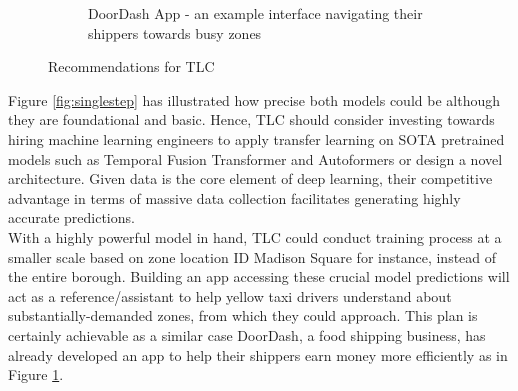 \documentclass[11pt]{article}
\begin{document}
\begin{figure}[ht]
\begin{subfigure}[b]{0.3\textwidth}
        \caption{DoorDash App - an example interface navigating their shippers towards busy zones}
        \label{subfig:plot2}
    \end{subfigure}
    \caption{Recommendations for TLC}
    \label{fig:doordash}
\end{figure}

Figure \ref{fig:singlestep} has illustrated how precise both models could be although they are foundational and basic. Hence, TLC should consider investing towards hiring machine learning engineers to apply transfer learning on SOTA pretrained models such as Temporal Fusion Transformer and Autoformers or design a novel architecture. Given data is the core element of deep learning,  their competitive advantage in terms of massive data collection facilitates generating highly accurate predictions.\\
    
With a highly powerful model in hand, TLC could conduct training process at a smaller scale based on zone location ID Madison Square for instance, instead of the entire borough. Building an app accessing these crucial model predictions will act as a reference/assistant to help yellow taxi drivers understand about substantially-demanded zones, from which they could approach. This plan is certainly achievable as a similar case DoorDash, a food shipping business, has already developed an app to help their shippers earn money more efficiently as in Figure \ref{subfig:plot2}. 


\end{document}
